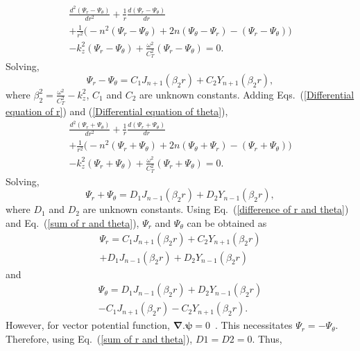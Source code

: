 \documentclass[10pt]{asme2ej}
\begin{document}
\begin{multline}
    \frac{d^{2}(\Psi_{r}-\Psi_\theta)}{dr^{2}} + \frac{1}{r}\frac{d(\Psi_{r}-\Psi_\theta)}{dr}\\ + \frac{1}{r^{2}}\bigg(-n^{2}(\Psi_{r}-\Psi_\theta )+ 2n(\Psi_{\theta}-\Psi_r)-(\Psi_{r}-\Psi_\theta)\bigg)\\ - k_{z}^{2}(\Psi_{r}-\Psi_\theta) + \frac{\omega^{2}}{C_{T}^{2}}(\Psi_{r}-\Psi_\theta) = 0.
\end{multline}
Solving,
\begin{equation}\label{difference of r and theta}
    \Psi_{r} -\Psi_{\theta} = C_{1}J_{n+1}(\beta_2 r) + C_{2}Y_{n+1}(\beta_2 r),
\end{equation}
where $\beta_2^{2} = \frac{\omega^{2}}{C_{T}^{2}} - k_z^{2}$, $C_1$ and $C_2$ are unknown constants.
Adding Eqs.~(\ref{Differential equation of r}) and (\ref{Differential equation of theta}),
\begin{multline}
    \frac{d^{2}(\Psi_{r}+\Psi_\theta)}{dr^{2}} + \frac{1}{r}\frac{d(\Psi_{r}+\Psi_\theta)}{dr}\\ + \frac{1}{r^{2}}\bigg(-n^{2}(\Psi_{r}+\Psi_\theta )+ 2n(\Psi_{\theta}+\Psi_r)-(\Psi_{r}+\Psi_\theta)\bigg)\\ - k_{z}^{2}(\Psi_{r}+\Psi_\theta) + \frac{\omega^{2}}{C_{T}^{2}}(\Psi_{r}+\Psi_\theta) = 0.
\end{multline}
Solving,
\begin{equation}\label{sum of r and theta}
    \Psi_{r} + \Psi_{\theta} = D_{1}J_{n-1}(\beta_2 r) + D_{2}Y_{n-1}(\beta_2 r),
\end{equation}
where $D_1$ and $D_2$ are unknown constants. Using Eq.~(\ref{difference of r and theta}) and Eq.~(\ref{sum of r and theta}), $\Psi_{r}$ and $\Psi_{\theta}$ can be obtained as
\begin{multline}\label{simplified eqn vector r}
    \Psi_{r} = C_{1}J_{n+1}(\beta_2 r) + C_{2}Y_{n+1}(\beta_2 r)\\ + D_{1}J_{n-1}(\beta_2 r) + D_{2}Y_{n-1}(\beta_2 r) 
\end{multline}
and
\begin{multline}\label{simplified eqn vector theta}
    \Psi_{\theta} = D_{1}J_{n-1}(\beta_2 r) + D_{2}Y_{n-1}(\beta_2 r)\\- C_{1}J_{n+1}(\beta_2 r) - C_{2}Y_{n+1}(\beta_2 r).
\end{multline}
However, for vector potential function, $\pmb{\nabla}.\pmb{\psi} = 0$~\cite{achenbach2012}. This necessitates  $\Psi_{r} = -\Psi_{\theta}$. Therefore, using Eq.~(\ref{sum of r and theta}), $D1 = D2 = 0$. Thus,
\end{document}
